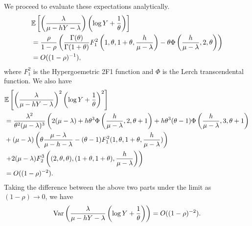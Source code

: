 We proceed to evaluate these expectations analytically.
\begin{align*}
& \mathbb{E} \left[ \left(\frac{\lambda}{\mu - hY - \lambda} \right)
\left( \log Y + \frac{1}{\theta} \right) \right] \\
&= \frac{\rho}{1-\rho}
\left(
\frac{\Gamma(\theta)}{\Gamma(1+\theta)}
F^{2}_{1}
\left(1,\theta,1+\theta,\frac{h}{\mu-\lambda} \right)
-
\theta\Phi \left(\frac{h}{\mu - \lambda},2,\theta \right)
\right) \\
&=O((1-\rho)^{-1}),
\end{align*}
where $F^{2}_{1}$ is the Hypergoemetric 2F1  function and $\Phi$ is the Lerch transcendental function.
We also have
\begin{align*}
& \mathbb{E} \left[ \left(\frac{\lambda}{\mu - hY - \lambda} \right)^{2}
\left( \log Y + \frac{1}{\theta} \right)^{2} \right] \\
& = \frac{\lambda^{2}}{\theta^{2}(\mu - \lambda)^{3}}
\left(
2(\mu - \lambda)
+ h\theta^{3}\Phi \left(\frac{h}{\mu - \lambda},2,\theta+1 \right)
+ h\theta^{3}(\theta - 1)\Phi \left(\frac{h}{\mu - \lambda},3,\theta+1 \right) \right. \\
& 
+ (\mu - \lambda) 
\left( \theta\frac{\mu - \lambda}{\mu - h - \lambda} - (\theta - 1) F_{1}^{2}(1,\theta,1+\theta,\frac{h}{\mu-\lambda})
\right) \\
&\left. +2(\mu -\lambda) F_{2}^{3}\left((2,\theta,\theta),(1+\theta,1+\theta),\frac{h}{\mu-\lambda}\right)
\right) \\
& = O((1-\rho)^{-2}).
\end{align*}
Taking the difference between the above two parts under the limit as $(1-\rho)\to 0$, we have
\[
{\rm Var}\left(\frac{\lambda}{\mu - hY - \lambda}
\left( \log Y + \frac{1}{\theta} \right)\right) =O((1-\rho)^{-2}).
\]

